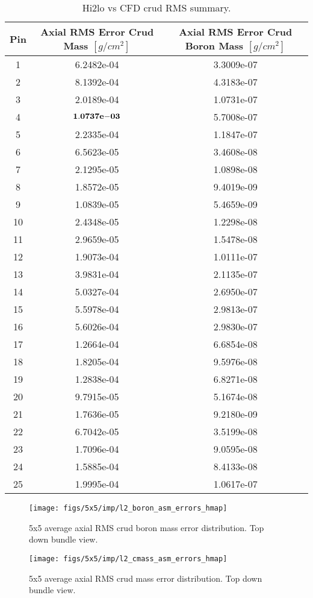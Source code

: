 \begin{table}[h]
    \begin{center}
        \caption[Hi2lo crud RMS summary.]{Hi2lo vs CFD crud RMS summary.}
    \begin{tabular}[h]{|c|C|C|}
        \hline
        Pin  & Axial RMS Error Crud Mass $[g/cm^2]$ & Axial RMS Error Crud Boron Mass $[g/cm^2]$ \\
\hline {}  & 6.2482e-04 &  3.3009e-07  \\
2  & 8.1392e-04 &  4.3183e-07  \\
3  & 2.0189e-04 &  1.0731e-07  \\
4  & $\mathbf{1.0737\mathrm{\bf e-}03}$ &  5.7008e-07  \\
5  & 2.2335e-04 &  1.1847e-07  \\
6  & 6.5623e-05 &  3.4608e-08  \\
7  & 2.1295e-05 &  1.0898e-08  \\
8  & 1.8572e-05 &  9.4019e-09  \\
9  & 1.0839e-05 &  5.4659e-09  \\
10 & 2.4348e-05 &  1.2298e-08  \\
11 & 2.9659e-05 &  1.5478e-08  \\
12 & 1.9073e-04 &  1.0111e-07  \\
13 & 3.9831e-04 &  2.1135e-07  \\
14 & 5.0327e-04 &  2.6950e-07  \\
15 & 5.5978e-04 &  2.9813e-07  \\
16 & 5.6026e-04 &  2.9830e-07  \\
17 & 1.2664e-04 &  6.6854e-08  \\
18 & 1.8205e-04 &  9.5976e-08  \\
19 & 1.2838e-04 &  6.8271e-08  \\
20 & 9.7915e-05 &  5.1674e-08  \\
21 & 1.7636e-05 &  9.2180e-09  \\
22 & 6.7042e-05 &  3.5199e-08  \\
23 & 1.7096e-04 &  9.0595e-08  \\
24 & 1.5885e-04 &  8.4133e-08  \\
25 & 1.9995e-04 &  1.0617e-07  \\
\hline
\end{tabular}
\label{tab:loo_rms}
\end{center}
\end{table}

\begin{figure}[H]
    \centering
    \texttt{[image: figs/5x5/imp/l2\_boron\_asm\_errors\_hmap]}
    \caption{5x5 average axial RMS crud boron mass error distribution.  Top down bundle view.}
    \label{fig:l2boronasmerrorshmap}
\end{figure}
\begin{figure}[H]
    \centering
    \texttt{[image: figs/5x5/imp/l2\_cmass\_asm\_errors\_hmap]}
    \caption{5x5 average axial RMS crud mass error distribution.  Top down bundle view.}
    \label{fig:l2cmassasmerrorshmap}
\end{figure}

